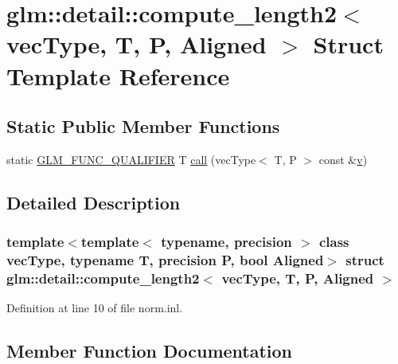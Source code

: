\hypertarget{structglm_1_1detail_1_1compute__length2}{}\section{glm\+::detail\+::compute\+\_\+length2$<$ vec\+Type, T, P, Aligned $>$ Struct Template Reference}
\label{structglm_1_1detail_1_1compute__length2}
\subsection*{Static Public Member Functions}
\begin{DoxyCompactItemize}
\item 
static \mbox{\hyperlink{setup_8hpp_a33fdea6f91c5f834105f7415e2a64407}{G\+L\+M\+\_\+\+F\+U\+N\+C\+\_\+\+Q\+U\+A\+L\+I\+F\+I\+ER}} T \mbox{\hyperlink{structglm_1_1detail_1_1compute__length2_ac5b7c631e103be04ad7510c8ed50f1d0}{call}} (vec\+Type$<$ T, P $>$ const \&\mbox{\hyperlink{glad_8h_a14cfbe2fc2234f5504618905b69d1e06}{v}})
\end{DoxyCompactItemize}


\subsection{Detailed Description}
\subsubsection*{template$<$template$<$ typename, precision $>$ class vec\+Type, typename T, precision P, bool Aligned$>$\newline
struct glm\+::detail\+::compute\+\_\+length2$<$ vec\+Type, T, P, Aligned $>$}



Definition at line 10 of file norm.\+inl.



\subsection{Member Function Documentation}
\mbox{\label{structglm_1_1detail_1_1compute__length2_ac5b7c631e103be04ad7510c8ed50f1d0}} 
